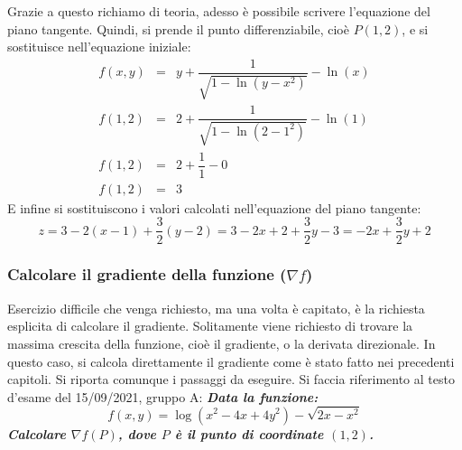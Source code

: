 \documentclass[a4paper]{article}
\begin{document}
	Grazie a questo richiamo di teoria, adesso è possibile scrivere l'equazione del piano tangente. Quindi, si prende il punto differenziabile, cioè $P\left(1,2\right)$, e si sostituisce nell'equazione iniziale:
	\begin{equation*}
		\begin{array}{rcl}
			f\left(x,y\right) &=& y + \dfrac{1}{\sqrt{1 - \ln\left(y - x^{2}\right)}} - \ln\left(x\right) \\ [1.5em]
			f\left(1,2\right) &=& 2 + \dfrac{1}{\sqrt{1 - \ln\left(2 - 1^{2}\right)}} - \ln\left(1\right) \\ [1.5em]
			f\left(1,2\right) &=& 2 + \dfrac{1}{1} - 0 \\ [1.5em]
			f\left(1,2\right) &=& 3
		\end{array}
	\end{equation*}
	E infine si sostituiscono i valori calcolati nell'equazione del piano tangente:
	\begin{equation*}
		z = 3 - 2\left(x - 1\right) + \dfrac{3}{2}\left(y-2\right) = 3 - 2x +2 + \dfrac{3}{2}y - 3 = -2x + \dfrac{3}{2}y + 2
	\end{equation*}\newpage

	\subsubsection{Calcolare il gradiente della funzione ($\nabla f$)}\label{par: calcolare il gradiente della funzione}

	Esercizio difficile che venga richiesto, ma una volta è capitato, è la richiesta esplicita di calcolare il gradiente. Solitamente viene richiesto di trovare la massima crescita della funzione, cioè il gradiente, o la derivata direzionale. In questo caso, si calcola direttamente il gradiente come è stato fatto nei precedenti capitoli. Si riporta comunque i passaggi da eseguire. Si faccia riferimento al testo d'esame del 15/09/2021, gruppo A: \textcolor{Green4}{\textbf{\emph{Data la funzione:}}
	\begin{equation*}
		f\left(x,y\right) = \log\left(x^{2} - 4x + 4y^{2}\right) - \sqrt{2x - x^{2}}
	\end{equation*}
	\textbf{\emph{Calcolare $\nabla f\left(P\right)$, dove $P$ è il punto di coordinate $(1,2)$.}}}\newline
	
\end{document}
